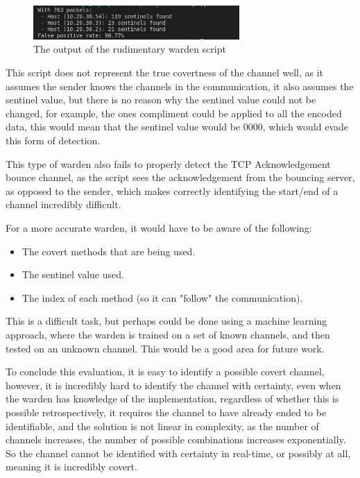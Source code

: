 \begin{figure}[H]
    \centering
    \includegraphics[width=0.7\textwidth]{fig/rudimentary_warden.png}
    \caption{The output of the rudimentary warden script}
    \label{fig:warden_output}
\end{figure}

This script does not represent the true covertness of the channel well, as it assumes the sender knows the channels in the communication, it also assumes the sentinel value, but there is no reason why the sentinel value could not be changed, for example, the ones compliment could be applied to all the encoded data, this would mean that the sentinel value would be 0000, which would evade this form of detection.

This type of warden also fails to properly detect the TCP Acknowledgement bounce channel, as the script sees the acknowledgement from the bouncing server, as opposed to the sender, which makes correctly identifying the start/end of a channel incredibly difficult.

For a more accurate warden, it would have to be aware of the following:

\begin{itemize}
    \item The covert methods that are being used.
    \item The sentinel value used.
    \item The index of each method (so it can "follow" the communication).
\end{itemize}

This is a difficult task, but perhaps could be done using a machine learning approach, where the warden is trained on a set of known channels, and then tested on an unknown channel. This would be a good area for future work.

To conclude this evaluation, it is easy to identify a possible covert channel, however, it is incredibly hard to identify the channel with certainty, even when the warden has knowledge of the implementation, regardless of whether this is possible retrospectively, it requires the channel to have already ended to be identifiable, and the solution is not linear in complexity, as the number of channels increases, the number of possible combinations increases exponentially. So the channel cannot be identified with certainty in real-time, or possibly at all, meaning it is incredibly covert.

